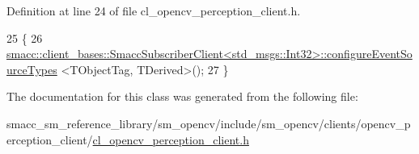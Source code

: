 Definition at line 24 of file cl\+\_\+opencv\+\_\+perception\+\_\+client.\+h.


\begin{DoxyCode}
25   \{
26     
      \hyperlink{classsmacc_1_1client__bases_1_1SmaccSubscriberClient}{smacc::client\_bases::SmaccSubscriberClient<std\_msgs::Int32>::configureEventSourceTypes}
      <TObjectTag, TDerived>();
27   \}
\end{DoxyCode}


The documentation for this class was generated from the following file\+:\begin{DoxyCompactItemize}
\item 
smacc\+\_\+sm\+\_\+reference\+\_\+library/sm\+\_\+opencv/include/sm\+\_\+opencv/clients/opencv\+\_\+perception\+\_\+client/\hyperlink{include_2sm__opencv_2clients_2opencv__perception__client_2cl__opencv__perception__client_8h}{cl\+\_\+opencv\+\_\+perception\+\_\+client.\+h}\end{DoxyCompactItemize}
